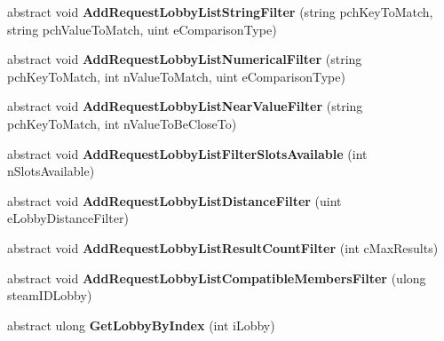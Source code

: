 \begin{DoxyCompactItemize}
abstract void {\bfseries Add\+Request\+Lobby\+List\+String\+Filter} (string pch\+Key\+To\+Match, string pch\+Value\+To\+Match, uint e\+Comparison\+Type)
\item 
\mbox{\label{class_valve_1_1_steamworks_1_1_i_steam_matchmaking_a81b89263ff569f73baaa372f137a8f07}} 
abstract void {\bfseries Add\+Request\+Lobby\+List\+Numerical\+Filter} (string pch\+Key\+To\+Match, int n\+Value\+To\+Match, uint e\+Comparison\+Type)
\item 
\mbox{\label{class_valve_1_1_steamworks_1_1_i_steam_matchmaking_a81cf3e05b88731f20d3879586e98a29b}} 
abstract void {\bfseries Add\+Request\+Lobby\+List\+Near\+Value\+Filter} (string pch\+Key\+To\+Match, int n\+Value\+To\+Be\+Close\+To)
\item 
\mbox{\label{class_valve_1_1_steamworks_1_1_i_steam_matchmaking_a71378a53d362ea6d618d7cb090c1095d}} 
abstract void {\bfseries Add\+Request\+Lobby\+List\+Filter\+Slots\+Available} (int n\+Slots\+Available)
\item 
\mbox{\label{class_valve_1_1_steamworks_1_1_i_steam_matchmaking_a2891d8cd94f25ffa533b11753dec4008}} 
abstract void {\bfseries Add\+Request\+Lobby\+List\+Distance\+Filter} (uint e\+Lobby\+Distance\+Filter)
\item 
\mbox{\label{class_valve_1_1_steamworks_1_1_i_steam_matchmaking_a12681ea090a46c171dca3479545b91a6}} 
abstract void {\bfseries Add\+Request\+Lobby\+List\+Result\+Count\+Filter} (int c\+Max\+Results)
\item 
\mbox{\label{class_valve_1_1_steamworks_1_1_i_steam_matchmaking_a54fe1f635b5e6d592a06faff52ce3df6}} 
abstract void {\bfseries Add\+Request\+Lobby\+List\+Compatible\+Members\+Filter} (ulong steam\+I\+D\+Lobby)
\item 
\mbox{\label{class_valve_1_1_steamworks_1_1_i_steam_matchmaking_a760332baefc766d8d82d5bec89bdbc7b}} 
abstract ulong {\bfseries Get\+Lobby\+By\+Index} (int i\+Lobby)

\end{DoxyCompactItemize}
